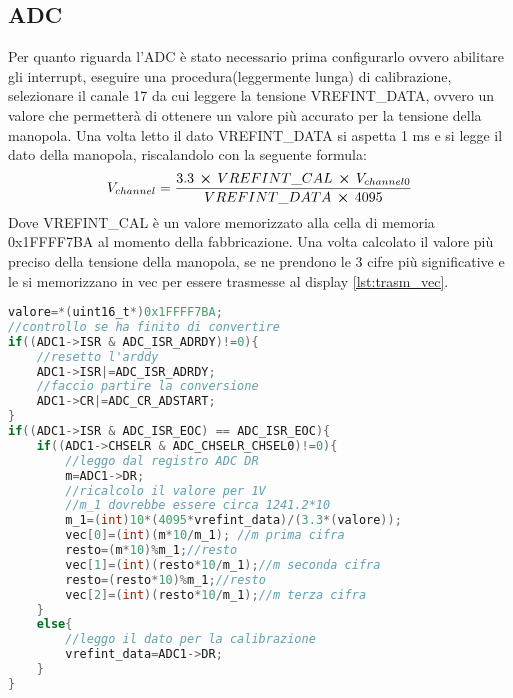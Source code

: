 \documentclass[main.tex]{subfiles}
\begin{document}
\subsection{ADC}
Per quanto riguarda l'ADC è stato necessario prima configurarlo ovvero abilitare gli interrupt, eseguire una procedura(leggermente lunga) di calibrazione, selezionare il canale 17 da cui leggere la tensione VREFINT\_DATA, ovvero un valore che permetterà di ottenere un valore più accurato per la tensione della manopola. Una volta letto il dato VREFINT\_DATA si aspetta 1 ms e si legge il dato della manopola, riscalandolo con la seguente formula:
\begin{equation}
    V_{channel}=\frac{3.3 \,\cross\,VREFINT\_CAL\,\cross\, V_{channel0} }{VREFINT\_DATA\, \cross\,4095}
\end{equation}
Dove VREFINT\_CAL è un valore memorizzato alla cella di memoria \\0x1FFFF7BA al momento della fabbricazione. 
Una volta calcolato il valore più preciso della tensione della manopola, se ne prendono le 3 cifre più significative e le si memorizzano in vec per essere trasmesse al display \ref{lst:trasm_vec}.
\begin{lstlisting}[language=C,caption=Gestione interrupt ADC]
valore=*(uint16_t*)0x1FFFF7BA;
//controllo se ha finito di convertire
if((ADC1->ISR & ADC_ISR_ADRDY)!=0){
	//resetto l'arddy
	ADC1->ISR|=ADC_ISR_ADRDY;
	//faccio partire la conversione
	ADC1->CR|=ADC_CR_ADSTART;	
}
if((ADC1->ISR & ADC_ISR_EOC) == ADC_ISR_EOC){
	if((ADC1->CHSELR & ADC_CHSELR_CHSEL0)!=0){
		//leggo dal registro ADC DR
		m=ADC1->DR;
		//ricalcolo il valore per 1V
		//m_1 dovrebbe essere circa 1241.2*10
		m_1=(int)10*(4095*vrefint_data)/(3.3*(valore)); 
		vec[0]=(int)(m*10/m_1); //m prima cifra
		resto=(m*10)%m_1;//resto
		vec[1]=(int)(resto*10/m_1);//m seconda cifra
		resto=(resto*10)%m_1;//resto
		vec[2]=(int)(resto*10/m_1);//m terza cifra
	}
	else{
		//leggo il dato per la calibrazione
		vrefint_data=ADC1->DR;
	}
}
\end{lstlisting}
\end{document}
